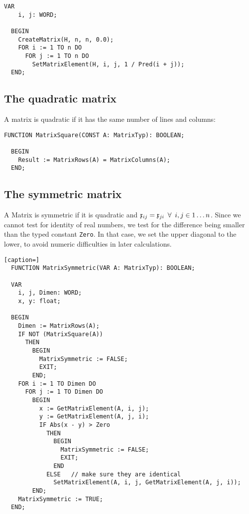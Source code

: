 \begin{refsection}
\begin{lstlisting}[caption=Hilbert matrix]
  VAR
    i, j: WORD;

  BEGIN
    CreateMatrix(H, n, n, 0.0);
    FOR i := 1 TO n DO
      FOR j := 1 TO n DO
        SetMatrixElement(H, i, j, 1 / Pred(i + j));
  END;
\end{lstlisting}

\subsection{The quadratic matrix}


A matrix is quadratic if it has the same number of lines and columns:

\begin{lstlisting}[caption=is matrix square?]
  FUNCTION MatrixSquare(CONST A: MatrixTyp): BOOLEAN;

  BEGIN
    Result := MatrixRows(A) = MatrixColumns(A);
  END;
\end{lstlisting}

\subsection{The symmetric matrix}

A Matrix is symmetric if it is quadratic and \(\mathfrak{x}_{ij} = \mathfrak{x}_{ji} \enspace\forall\enspace i,j \in 1\ldots n \). Since we cannot test for identity of real numbers, we test for the difference being smaller than the typed constant \texttt{Zero}. In that case, we set the upper diagonal to the lower, to avoid numeric difficulties in later calculations.

\begin{lstlisting}[caption=]
  FUNCTION MatrixSymmetric(VAR A: MatrixTyp): BOOLEAN;

  VAR
    i, j, Dimen: WORD;
    x, y: float;

  BEGIN
    Dimen := MatrixRows(A);
    IF NOT (MatrixSquare(A))
      THEN
        BEGIN
          MatrixSymmetric := FALSE;
          EXIT;
        END;
    FOR i := 1 TO Dimen DO
      FOR j := 1 TO Dimen DO
        BEGIN
          x := GetMatrixElement(A, i, j);
          y := GetMatrixElement(A, j, i);
          IF Abs(x - y) > Zero
            THEN
              BEGIN
                MatrixSymmetric := FALSE;
                EXIT;
              END
            ELSE   // make sure they are identical
              SetMatrixElement(A, i, j, GetMatrixElement(A, j, i));
        END;
    MatrixSymmetric := TRUE;
  END;
\end{lstlisting}


\end{refsection}

